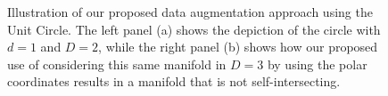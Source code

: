 \documentclass[12pt]{article}
\theoremstyle{definition}
\begin{document}
\begin{figure}[ht]
  \centering
  \hfill
  \caption{Illustration of our proposed data augmentation approach using the Unit Circle. The left panel (a) shows the depiction of the circle with $d=1$ and $D=2$, while the right panel (b) shows how our proposed use of considering this same manifold in $D=3$ by using the polar coordinates results in a manifold that is not self-intersecting.}
  \label{fig:unit_circle_augmentation}
\end{figure}
\end{document}
